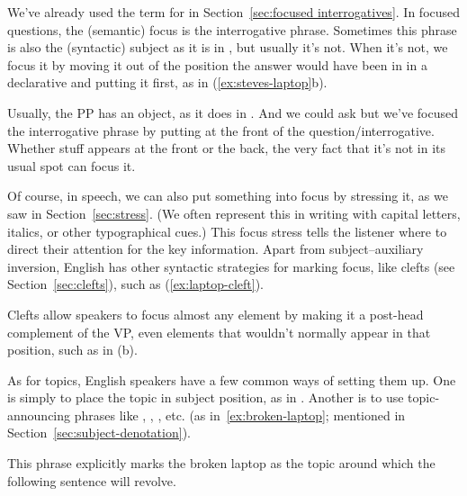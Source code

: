 We've already used the term  for  in Section~\ref{sec:focused interrogatives}. In focused questions, the (semantic) focus is the interrogative phrase. Sometimes this phrase is also the (syntactic) subject as it is in , but usually it's not. When it's not, we focus it by moving it out of the position the answer would have been in in a declarative and putting it first, as in (\ref{ex:steves-laptop}b). 


Usually, the  PP has an object, as it does in . And we could ask  but we've focused the interrogative phrase by putting  at the front of the question/interrogative. Whether stuff appears at the front or the back, the very fact that it's not in its usual spot can focus it.

Of course, in speech, we can also put something into focus by stressing it, as we saw in Section~\ref{sec:stress}. (We often represent this in writing with capital letters, italics, or other typographical cues.) This focus stress tells the listener where to direct their attention for the key information.
Apart from subject--auxiliary inversion, English has other syntactic strategies for marking focus, like clefts (see Section~\ref{sec:clefts}), such as (\ref{ex:laptop-cleft}).

\ea\label{ex:laptop-cleft}
    \z
\z
Clefts allow speakers to focus almost any element by making it a post-head complement of the VP, even elements that wouldn't normally appear in that position, such as  in (b).

As for topics, English speakers have a few common ways of setting them up. One is simply to place the topic in subject position, as in . Another is to use topic-announcing phrases like , , , etc. (as in~\ref{ex:broken-laptop}; mentioned in Section~\ref{sec:subject-denotation}).

\label{ex:broken-laptop}
\z
This phrase explicitly marks the broken laptop as the topic around which the following sentence will revolve.

